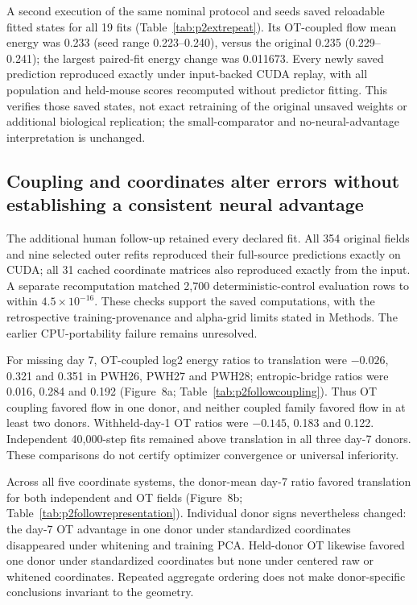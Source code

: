 \documentclass[10pt,a4paper]{article}
\begin{document}
A second execution of the same nominal protocol and seeds saved reloadable fitted states for all 19 fits (Table~\ref{tab:p2extrepeat}). Its OT-coupled flow mean energy was 0.233 (seed range 0.223--0.240), versus the original 0.235 (0.229--0.241); the largest paired-fit energy change was 0.011673. Every newly saved prediction reproduced exactly under input-backed CUDA replay, with all population and held-mouse scores recomputed without predictor fitting. This verifies those saved states, not exact retraining of the original unsaved weights or additional biological replication; the small-comparator and no-neural-advantage interpretation is unchanged.

\subsection{Coupling and coordinates alter errors without establishing a consistent neural advantage}
The additional human follow-up retained every declared fit. All 354 original fields and nine selected outer refits reproduced their full-source predictions exactly on CUDA; all 31 cached coordinate matrices also reproduced exactly from the input. A separate recomputation matched 2,700 deterministic-control evaluation rows to within $4.5\times10^{-16}$. These checks support the saved computations, with the retrospective training-provenance and alpha-grid limits stated in Methods. The earlier CPU-portability failure remains unresolved.

For missing day 7, OT-coupled log2 energy ratios to translation were $-0.026$, 0.321 and 0.351 in PWH26, PWH27 and PWH28; entropic-bridge ratios were 0.016, 0.284 and 0.192 (Figure~8a\label{call:p2f9}; Table~\ref{tab:p2followcoupling}). Thus OT coupling favored flow in one donor, and neither coupled family favored flow in at least two donors. Withheld-day-1 OT ratios were $-0.145$, 0.183 and 0.122. Independent 40,000-step fits remained above translation in all three day-7 donors. These comparisons do not certify optimizer convergence or universal inferiority.

Across all five coordinate systems, the donor-mean day-7 ratio favored translation for both independent and OT fields (Figure~8b; Table~\ref{tab:p2followrepresentation}). Individual donor signs nevertheless changed: the day-7 OT advantage in one donor under standardized coordinates disappeared under whitening and training PCA. Held-donor OT likewise favored one donor under standardized coordinates but none under centered raw or whitened coordinates. Repeated aggregate ordering does not make donor-specific conclusions invariant to the geometry.
\end{document}
